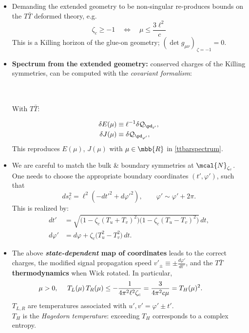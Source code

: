 \documentclass[10pt]{article}
\newcommand{\citations}[1]{{\footnotesize#1\par}}
\newcommand{\TTbar}{\texorpdfstring{\ensuremath{T\bar{T}}}{TTbar}\xspace}
\begin{document}
\begin{multicols}{3}
\begin{itemize}

\item Demanding the extended geometry to be non-singular
	re-produces bounds on the \TTbar deformed theory, e.g.
	\begin{equation}
		\zeta_c \ge -1 \quad \Leftrightarrow \quad\mu\le \frac{ 3\ell^2 }{c} \label{reality}
	\end{equation}
	This is a Killing horizon of the glue-on geometry;
	$(\det g_{\mu\nu})_{\,\zeta = -1} = 0$.

\item \textbf{Spectrum from the extended geometry:} \mbox{conserved} charges of the Killing symmetries, can be computed with the \textit{covariant formalism}:

\citations{
	\textcite{Iyer:1994ys}\\
	\textcite{Barnich:2001jy}\\
	With \TTbar: \textcite{Kraus:2021cwf}
}\vspace{-1.5\baselineskip}
	\begin{align*}
		\delta E(\mu) &\equiv  \ell^{-1} \delta \mathcal Q_{\pd_{t'}}, \\ \delta J(\mu) &\equiv  \delta \mathcal Q_{\pd_{\varphi'}},
	\end{align*}
	This reproduces $E(\mu)$, $J(\mu)$ with $\mu \in\mbb{R}$ in \eqref{ttbarspectrum}.

\item We are careful to match the bulk \& boundary symmetries at $\mcal{N}_{\zeta_c}$.
One needs to choose the appropriate boundary coordinates $(t',\varphi')$, such that
	\begin{equation}
		ds^2_c = \ell^2 ( -dt'^2 + d\varphi'^2) , \qquad \varphi' \sim \varphi' + 2\pi.\label{cutoffmetric}
	\end{equation}
This is realized by:
	\begin{align*}
		dt' &= \sqrt{ \big(1 - \zeta_c (T_u+T_v)^2 \big) \big(1 - \zeta_c (T_u-T_v)^2 \big) } \, dt,  \\
		 d\varphi' &= d\varphi + \zeta_c \big( T_u^2 - T_v^2 \big)\,dt.
	\end{align*}

\item The above \textbf{\textit{state-dependent} map of \mbox{coordinates}} leads to the correct charges, the modified signal propagation speed $v'_{\pm} \equiv \pm \frac{d\varphi'}{dt'}$, and the \TTbar \textbf{thermodynamics} when Wick rotated. In particular,
	\begin{equation}
	\hspace{-2.5em} \mu > 0,\ \quad
		T_L(\mu)\,T_R(\mu) \le - \frac{1}{4\pi^2 \ell^2 \zeta_c} = \frac{3}{4\pi^2c\mu} = T_H(\mu)^2.
	\end{equation}
	$T_{L,R}$ are temperatures associated with $u',v' = \varphi' \pm t'$.\\
	$T_H$ is the \textit{Hagedorn temperature}: exceeding $T_H$ corresponds to a complex entropy.


\end{itemize}
\end{multicols}
\end{document}

